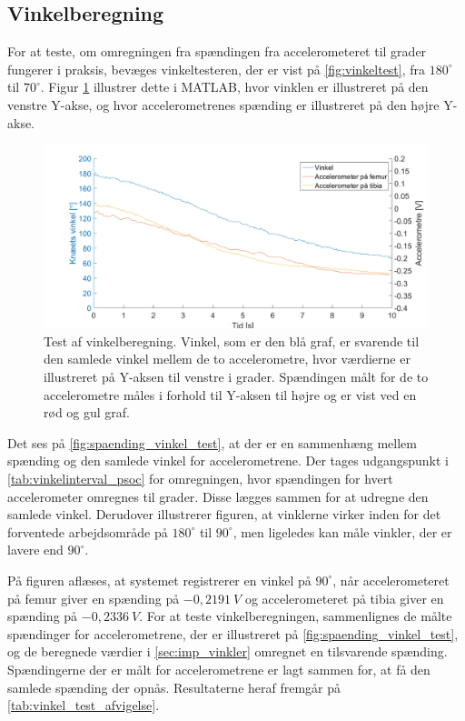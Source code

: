 \subsection{Vinkelberegning}

For at teste, om omregningen fra spændingen fra accelerometeret til grader fungerer i praksis, bevæges vinkeltesteren, der er vist på \autoref{fig:vinkeltest}, fra $180^{\circ}$ til $70^{\circ}$. Figur \ref{fig:spaending_vinkel_test} illustrer dette i MATLAB, hvor vinklen er illustreret på den venstre Y-akse, og hvor accelerometrenes spænding er illustreret på den højre Y-akse.

\begin{figure}[H]
\centering
\includegraphics[width=1\textwidth]{figures/spaending_vinkel_test}
\caption{Test af vinkelberegning. Vinkel, som er den blå graf, er svarende til den samlede vinkel mellem de to accelerometre, hvor værdierne er illustreret på Y-aksen til venstre i grader. Spændingen målt for de to accelerometre måles i forhold til Y-aksen til højre og er vist ved en rød og gul graf.}
\label{fig:spaending_vinkel_test}
\end{figure}

\noindent
Det ses på \autoref{fig:spaending_vinkel_test}, at der er en sammenhæng mellem spænding og den samlede vinkel for accelerometrene. Der tages udgangspunkt i \autoref{tab:vinkelinterval_psoc} for omregningen, hvor spændingen for hvert accelerometer omregnes til grader. Disse lægges sammen for at udregne den samlede vinkel. Derudover illustrerer figuren, at vinklerne virker inden for det forventede arbejdsområde på $180^{\circ}$ til $90^{\circ}$, men ligeledes kan måle vinkler, der er lavere end $90^{\circ}$.

På figuren aflæses, at systemet registrerer en vinkel på $90^{\circ}$, når  accelerometeret på femur giver en spænding på $-0,2191~V$ og accelerometeret på tibia giver en spænding på $-0,2336~V$. For at teste vinkelberegningen, sammenlignes de målte spændinger for accelerometrene, der er illustreret på \autoref{fig:spaending_vinkel_test}, og de beregnede værdier i \autoref{sec:imp_vinkler} omregnet en tilsvarende spænding. Spændingerne der er målt for accelerometrene er lagt sammen for, at få den samlede spænding der opnås. Resultaterne heraf fremgår på \autoref{tab:vinkel_test_afvigelse}.  

